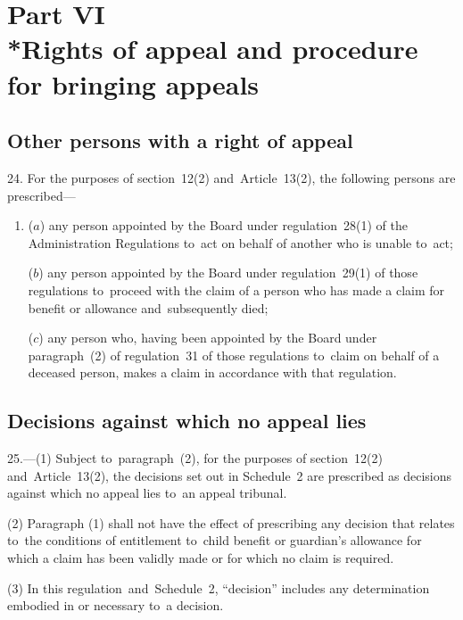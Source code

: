 \documentclass[12pt,a4paper]{article}
\begin{document}
\section[Part VI --- Rights of appeal and procedure for bringing appeals]{Part VI\\*Rights of appeal and procedure for bringing appeals}

\renewcommand\parthead{--- Part VI}

\subsection[24. Other persons with a right of appeal]{Other persons with a right of appeal}

24.  For the purposes of section~12(2) and~Article~13(2), the following persons are prescribed—
\begin{enumerate}\item[]
($a$) any person appointed by the Board under regulation~28(1) of the Administration Regulations to~act on behalf of another who is unable to~act;

($b$) any person appointed by the Board under regulation~29(1) of those regulations to~proceed with the claim of a person who has made a claim for benefit or allowance and~subsequently died;

($c$) any person who, having been appointed by the Board under paragraph~(2) of regulation~31 of those regulations to~claim on behalf of a deceased person, makes a claim in accordance with that regulation.
\end{enumerate}

\subsection[25. Decisions against which no appeal lies]{Decisions against which no appeal lies}

25.---(1)  Subject to~paragraph~(2), for the purposes of section~12(2) and~Article~13(2), the decisions set out in Schedule~2 are prescribed as decisions against which no appeal lies to~an appeal tribunal.

(2) Paragraph (1) shall not have the effect of prescribing any decision that relates to~the conditions of entitlement to~child benefit or guardian’s allowance for which a claim has been validly made or for which no claim is required.

(3) In this regulation~and~Schedule~2, “decision” includes any determination embodied in or necessary to~a decision.
\end{document}
